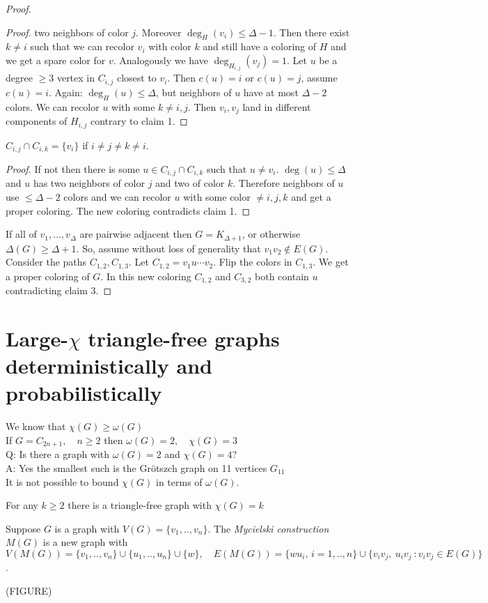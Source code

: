 \begin{proof}
\begin{proof}
two neighbors of color $j$. Moreover $\deg_H(v_i) \le \Delta - 1$. Then
there exist $k \neq i$ such that we can recolor $v_i$ with color $k$ and
still have a coloring of $H$ and we get a spare color for $v$.
Analogously we have $\deg_{H_{i,j}}(v_j) = 1$. Let $u$ be a degree $\ge
3$ vertex in $C_{i,j}$ closest to $v_i$. Then $c(u) = i$ or $c(u) = j$,
assume $c(u) = i$. Again: $\deg_H(u) \le \Delta$, but neighbors of $u$
have at most $\Delta - 2$ colors. We can recolor $u$ with some $k
\neq i,j$. Then $v_i,v_j$ land in different components of $H_{i,j}$
contrary to claim 1. 
\end{proof}
\begin{claim}[3]
$C_{i,j} \cap C_{i,k} = \{v_i\}$ if $i \neq j \neq k \neq i$.
\end{claim}
\begin{proof}
If not then there is some $u \in C_{i,j} \cap C_{i,k}$ such that $u \neq
v_i$. $\deg(u) \le \Delta$ and $u$ has two neighbors of color $j$ and
two of color $k$. Therefore neighbors of $u$ use $\le \Delta - 2$ colors
and we can recolor $u$ with some color $\neq i,j,k$ and get a proper
coloring. The new coloring contradicts claim 1.
\end{proof}
If all of $v_1,\ldots,v_{\Delta}$ are pairwise adjacent then $G =
K_{\Delta + 1}$, or otherwise $\Delta(G) \ge \Delta + 1$.  So, assume without
loss of generality that $v_1v_2 \notin E(G)$. Consider the paths
$C_{1,2},C_{1,3}$. Let $C_{1,2} = v_1u\cdots v_2$. Flip the colors in
$C_{1,3}$. We get a proper coloring of $G$. In this new coloring
$C_{1,2}$ and $C_{3,2}$ both contain $u$ contradicting claim 3.
\end{proof}



\section{Large-$\chi$ triangle-free graphs deterministically and probabilistically}

We know that $\chi(G)\geq\omega(G)$ \\
If $G=C_{2n+1}, \quad n\geq 2$ then $\omega(G)=2,\quad \chi(G)=3$ \\
Q: Is there a graph with $\omega(G)=2$ and $\chi(G)=4$? \\
A: Yes the smallest such is the Gr{\"o}tszch graph on 11 vertices $G_{11}$ \\

It is not possible to bound $\chi(G)$ in terms of $\omega(G)$.
\begin{theorem} 
For any $k\geq2$ there is a triangle-free graph with $\chi(G)=k$
\end{theorem}
\begin{definition}
Suppose $G$ is a graph with $V(G)=\{v_1,..,v_n\}$. The \emph{Mycielski construction} $M(G)$ is a new graph with $V(M(G))=\{v_1 ,..,v_n\}\cup\{u_1,..,u_n\}\cup\{w\}, \quad E(M(G))=\{wu_i,\, i=1,..,n\} \cup \{v_i v_j,\ u_iv_j\ : v_iv_j \in E(G)\}$.

(FIGURE)
\end{definition}

